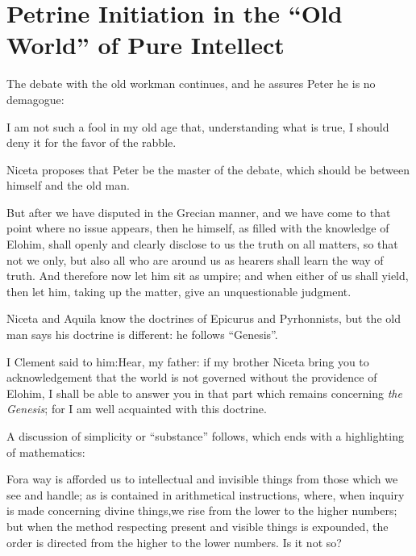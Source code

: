 \section{Petrine Initiation in the “Old World” of Pure Intellect}

The debate with the old workman continues, and he assures Peter he is no demagogue:

\begin{quotex}
I am not such a fool in my old age that, understanding what is true, I should deny it for the favor of the rabble.
\end{quotex}


Niceta proposes that Peter be the master of the debate, which should be between himself and the old man.

\begin{quotex}
But after we have disputed in the Grecian manner, and we have come to that point where no issue appears, then he himself, as filled with the knowledge of Elohim, shall openly and clearly disclose to us the truth on all matters, so that not we only, but also all who are around us as hearers shall learn the way of truth. And therefore now let him sit as umpire; and when either of us shall yield, then let him, taking up the matter, give an unquestionable judgment.
\end{quotex}


Niceta and Aquila know the doctrines of Epicurus and Pyrhonnists, but the old man says his doctrine is different: he follows ``Genesis''.

\begin{quotex}
I Clement said to him:Hear, my father: if my brother Niceta bring you to acknowledgement that the world is not governed without the providence of Elohim, I shall be able to answer you in that part which remains concerning \emph{the Genesis}; for I am well acquainted with this doctrine.
\end{quotex}


A discussion of simplicity or ``substance'' follows, which ends with a highlighting of mathematics:

Fora way is afforded us to intellectual and invisible things from those which we see and handle; as is contained in arithmetical instructions, where, when inquiry is made concerning divine things,we rise from the lower to the higher numbers; but when the method respecting present and visible things is expounded, the order is directed from the higher to the lower numbers. Is it not so?

